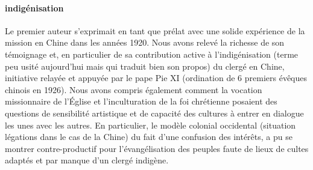 \paragraph{indigénisation}
Le premier auteur s’exprimait en tant que prélat avec une solide expérience de la mission en Chine dans les années 1920. Nous avons relevé la richesse de son témoignage et, en particulier de sa contribution active à l’indigénisation (terme peu usité aujourd’hui mais qui traduit bien son propos) du clergé en Chine, initiative relayée et appuyée par le pape Pie XI (ordination de 6 premiers évêques chinois en 1926). Nous avons compris également comment la vocation missionnaire de l’Église et l’inculturation de la foi chrétienne posaient des questions de sensibilité artistique et de capacité des cultures à entrer en dialogue les unes avec les autres. En particulier, le modèle colonial occidental (situation légations dans le cas de la Chine) du fait d’une confusion des intérêts, a pu se montrer contre-productif pour l’évangélisation des peuples faute de lieux de cultes adaptés et par manque d’un clergé indigène.

